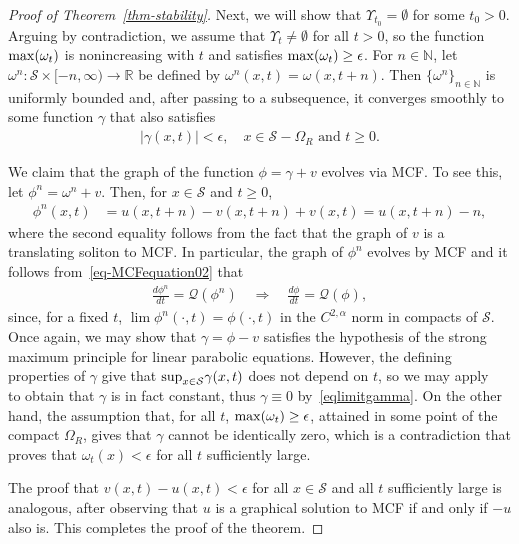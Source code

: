\documentclass{amsart}[12pt]
\newcommand{\cS}{\mathcal{S}}
\newcommand{\cQ}{\mathcal{Q}}
\newcommand{\es}{\emptyset}
\theoremstyle{definition}
\theoremstyle{plain}
\newcommand{\R}{\mathbb{R} }
\newcommand{\N}{\mathbb{N} }
\newcommand{\abs}[1]{\vert #1\vert}
\renewcommand{\Omega}{\varOmega}
\begin{document}
\begin{proof}[Proof of Theorem~\ref{thm-stability}]
Next, we will show that $\Upsilon_{t_0} = \es$ for some $t_0 >0$.
Arguing by contradiction, we
assume that $\Upsilon_t\neq \emptyset$ for all $t>0$,
so the function ${\rm max}(\omega_t)$ is nonincreasing with
$t$ and satisfies ${\rm max}(\omega_t)\geq \epsilon$.
For $n\in\N$, let $\omega^n\colon \cS\times[-n,\infty)\to \R$
be defined by $\omega^n(x,t) = \omega(x,t+n)$.
Then $\{\omega^n\}_{n\in\N}$ is uniformly bounded and, after passing
to a subsequence, it converges
smoothly to
some function $\gamma$ that also satisfies
\begin{align}\label{eqlimitgamma}
\abs{\gamma(x,t)}<\epsilon,\quad x\in \cS - \Omega_{R}\text{ and }
t\geq0.
\end{align}

We claim that the graph of the function $\phi = \gamma+v$
evolves via MCF. To see this,
let $\phi^n = \omega^n + v$. Then, for $x\in \cS$ and $t\geq 0$,
\begin{align*}
\phi^n(x,t) & = u(x,t+n)-v(x,t+n)+v(x,t) = u(x,t+n)-n,
\end{align*}
where the second equality follows from the fact that the graph
of $v$ is a translating soliton to MCF. In particular,
the graph of $\phi^n$ evolves by MCF and it follows
from~\eqref{eq-MCFequation02} that
\begin{align*}
\frac{d\phi^n}{dt} = \cQ(\phi^n) \quad \Longrightarrow \quad
\frac{d\phi}{dt} = \cQ(\phi),
\end{align*}
since, for a fixed $t$,
$\lim \phi^n(\cdot,t) = \phi(\cdot,t)$
in the $C^{2,\alpha}$ norm in compacts of $\cS$.
Once again, we may show that $\gamma = \phi - v$ satisfies
the hypothesis of the strong maximum principle for linear
parabolic equations. However, the defining properties of
$\gamma$ give that ${\rm sup}_{x\in \cS}\gamma(x,t)$ does not
depend on $t$, so we may apply~\cite[Corollary~2.1.2.]{mantegazza}
to obtain that $\gamma$ is in fact constant, thus $\gamma \equiv 0$
by~\eqref{eqlimitgamma}. On the other hand, the
assumption that, for all $t$, ${\rm max}(\omega_t) \geq \epsilon$,
attained in some point of the compact $\Omega_{R}$, gives that $\gamma$
cannot be identically zero, which is a contradiction
that proves that $\omega_t(x) <\epsilon$ for all $t$ sufficiently large.


The proof that
$v(x,t)-u(x,t) <\epsilon$ for all $x\in \cS$ and all
$t$ sufficiently large is analogous, after observing that $u$ is a
graphical solution to MCF if and only if $-u$ also is. This completes
the proof of the theorem.
\end{proof}
\end{document}
